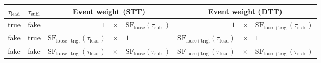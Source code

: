 \begin{tabular}{cc@{\hskip 2em}rcl@{\hskip 2em}rcl}
  \toprule
  $\tau_{\text{lead}}$ & $\tau_{\text{subl}}$ & \multicolumn{3}{c}{Event weight (STT)} & \multicolumn{3}{c}{Event weight (DTT)} \\
  \midrule
  true & fake & $1$ & $\times$ & $\text{SF}_\text{loose}(\tau_{\text{subl}})$
              & $1$ & $\times$ & $\text{SF}_\text{loose+trig.}(\tau_{\text{subl}})$ \\[0.2em]

  fake & true & $\text{SF}_\text{loose+trig.}(\tau_{\text{lead}})$ & $\times$ & $1$
              & $\text{SF}_\text{loose+trig.}(\tau_{\text{lead}})$ & $\times$ & $1$ \\[0.2em]

  fake & fake & $\text{SF}_\text{loose+trig.}(\tau_{\text{lead}})$ & $\times$ & $\text{SF}_\text{loose}(\tau_{\text{subl}})$
              & $\text{SF}_\text{loose+trig.}(\tau_{\text{lead}})$ & $\times$ & $\text{SF}_\text{loose+trig.}(\tau_{\text{subl}})$ \\
  \bottomrule
\end{tabular}

